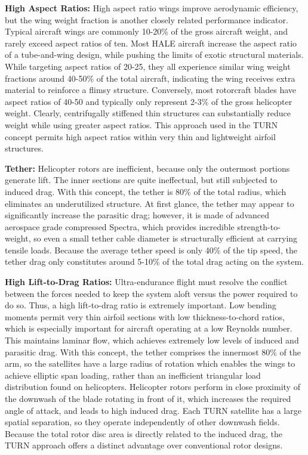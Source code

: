 \documentclass[11pt]{article}
\begin{document}
{\bf High Aspect Ratios:}
High aspect ratio wings improve aerodynamic efficiency, but the wing weight fraction is another closely related performance indicator.  Typical aircraft wings are commonly 10-20\% of the gross aircraft weight, and rarely exceed aspect ratios of ten.  Most HALE aircraft increase the aspect ratio of a tube-and-wing design, while pushing the limits of exotic structural materials.  While targeting aspect ratios of 20-25, they all experience similar wing weight fractions around 40-50\% of the total aircraft, indicating the wing receives extra material to reinforce a flimsy structure.  Conversely, most rotorcraft blades have aspect ratios of 40-50 and typically only represent 2-3\% of the gross helicopter weight.  Clearly, centrifugally stiffened thin structures can substantially reduce weight while using greater aspect ratios.  This approach used in the TURN concept permits high aspect ratios within very thin and lightweight airfoil structures.


{\bf Tether:}
Helicopter rotors are inefficient, because only the outermost portions generate lift.  The inner sections are quite ineffectual, but still subjected to induced drag.  With this concept, the tether is 80\% of the total radius, which eliminates an underutilized structure.  At first glance, the tether may appear to significantly increase the parasitic drag; however, it is made of advanced aerospace grade compressed Spectra, which provides incredible strength-to-weight, so even a small tether cable diameter is structurally efficient at carrying tensile loads.  Because the average tether speed is only 40\% of the tip speed, the tether drag only constitutes around 5-10\% of the total drag acting on the system.


{\bf High Lift-to-Drag Ratios:}
Ultra-endurance flight must resolve the conflict between the forces needed to keep the system aloft versus the power required to do so.  Thus, a high lift-to-drag ratio is extremely important.  Low bending moments permit very thin airfoil sections with low thickness-to-chord ratios, which is especially important for aircraft operating at a low Reynolds number.  This maintains laminar flow, which achieves extremely low levels of induced and parasitic drag.  With this concept, the tether comprises the innermost 80\% of the arm, so the satellites have a large radius of rotation which enables the wings to achieve elliptic span loading, rather than an inefficient triangular load distribution found on helicopters.  Helicopter rotors perform in close proximity of the downwash of the blade rotating in front of it, which increases the required angle of attack, and leads to high induced drag.  Each TURN satellite has a large spatial separation, so they operate independently of other downwash fields.  Because the total rotor disc area is directly related to the induced drag, the TURN approach offers a distinct advantage over conventional rotor designs.
\end{document}
